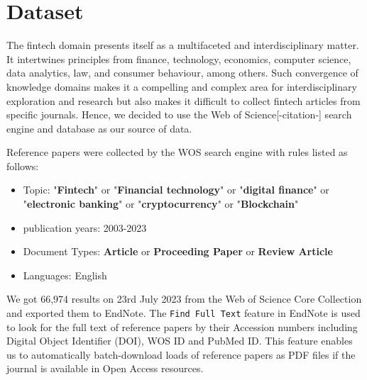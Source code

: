 \section{Dataset}
The fintech domain presents itself as a multifaceted and interdisciplinary matter.
It intertwines principles from finance, technology, economics, computer science, data analytics, law, and consumer behaviour, among others.
Such convergence of knowledge domains makes it a compelling and complex area for interdisciplinary exploration and research but also makes it difficult to collect fintech articles from specific journals.
Hence, we decided to use the Web of Science[-citation-] search engine and database as our source of data.

Reference papers were collected by the WOS search engine with rules listed as follows:
\begin{itemize}
    \item  Topic: "\textbf{Fintech}" or "\textbf{Financial technology}" or "\textbf{digital finance}" or "\textbf{electronic banking}" or "\textbf{cryptocurrency}" or "\textbf{Blockchain}"
    \item publication years: 2003-2023
    \item Document Types: \textbf{Article} or \textbf{Proceeding Paper} or \textbf{Review Article}
    \item Languages: English
\end{itemize}

We got 66,974 results on 23rd July 2023 from the Web of Science Core Collection and exported them to EndNote.
The \verb|Find Full Text| feature in EndNote is used to look for the full text of reference papers by their Accession numbers including Digital Object Identifier (DOI), WOS ID and PubMed ID.
This feature enables us to automatically batch-download loads of reference papers as PDF files if the journal is available in Open Access resources.

